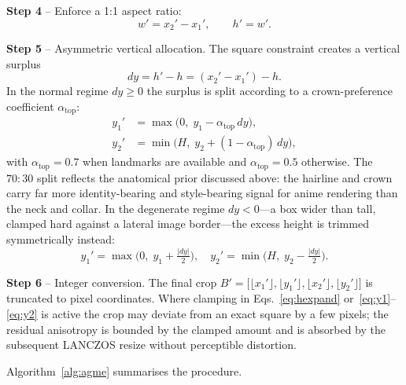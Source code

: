 \documentclass[journal]{IEEEtran}
\begin{document}
\textbf{Step 4} -- Enforce a 1:1 aspect ratio:
\begin{equation}
w' = x_2' - x_1', \qquad h' = w'.
\label{eq:square}
\end{equation}

\textbf{Step 5} -- Asymmetric vertical allocation. The square constraint creates a vertical surplus
\begin{equation}
dy = h' - h = (x_2' - x_1') - h .
\label{eq:dy}
\end{equation}
In the normal regime $dy \geq 0$ the surplus is split according to a crown-preference coefficient $\alpha_{\text{top}}$:
\begin{align}
y_1' &= \max\!\big(0,\; y_1 - \alpha_{\text{top}}\, dy\big), \label{eq:y1}\\
y_2' &= \min\!\big(H,\; y_2 + (1 - \alpha_{\text{top}})\, dy\big), \label{eq:y2}
\end{align}
with $\alpha_{\text{top}} = 0.7$ when landmarks are available and $\alpha_{\text{top}} = 0.5$ otherwise. The $70{:}30$ split reflects the anatomical prior discussed above: the hairline and crown carry far more identity-bearing and style-bearing signal for anime rendering than the neck and collar. In the degenerate regime $dy < 0$---a box wider than tall, clamped hard against a lateral image border---the excess height is trimmed symmetrically instead:
\begin{equation}
y_1' = \max\!\Big(0,\; y_1 + \tfrac{|dy|}{2}\Big), \quad
y_2' = \min\!\Big(H,\; y_2 - \tfrac{|dy|}{2}\Big).
\label{eq:ydegen}
\end{equation}

\textbf{Step 6} -- Integer conversion. The final crop $B' = \big[\lfloor x_1' \rfloor, \lfloor y_1' \rfloor, \lfloor x_2' \rfloor, \lfloor y_2' \rfloor\big]$ is truncated to pixel coordinates. Where clamping in Eqs.~\eqref{eq:hexpand} or~\eqref{eq:y1}--\eqref{eq:y2} is active the crop may deviate from an exact square by a few pixels; the residual anisotropy is bounded by the clamped amount and is absorbed by the subsequent LANCZOS resize without perceptible distortion.

Algorithm~\ref{alg:agme} summarises the procedure.
\end{document}
